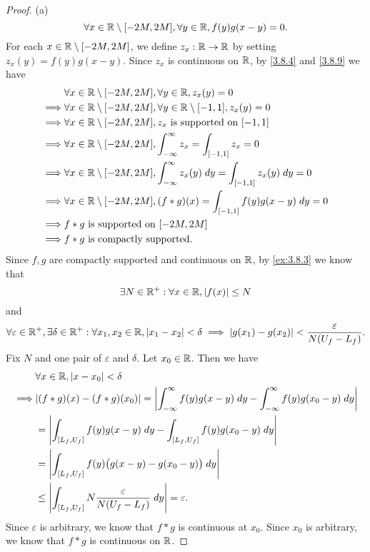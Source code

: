 \begin{proof}{(a)}
  \[
    \forall x \in \mathbb{R} \setminus [-2M, 2M], \forall y \in \mathbb{R}, f(y) g(x - y) = 0.
  \]
  For each \(x \in \mathbb{R} \setminus [-2M, 2M]\), we define \(z_x : \mathbb{R} \to \mathbb{R}\) by setting \(z_x(y) = f(y) g(x - y)\).
  Since \(z_x\) is continuous on \(\mathbb{R}\), by \cref{3.8.4} and \cref{3.8.9} we have
  \begin{align*}
             & \forall x \in \mathbb{R} \setminus [-2M, 2M], \forall y \in \mathbb{R}, z_x(y) = 0                                         \\
    \implies & \forall x \in \mathbb{R} \setminus [-2M, 2M], \forall y \in \mathbb{R} \setminus [-1, 1], z_x(y) = 0                       \\
    \implies & \forall x \in \mathbb{R} \setminus [-2M, 2M], z_x \text{ is supported on } [-1, 1]                                 \\
    \implies & \forall x \in \mathbb{R} \setminus [-2M, 2M], \int_{-\infty}^\infty z_x = \int_{[-1, 1]} z_x = 0                   \\
    \implies & \forall x \in \mathbb{R} \setminus [-2M, 2M], \int_{-\infty}^\infty z_x(y) \; dy = \int_{[-1, 1]} z_x(y) \; dy = 0 \\
    \implies & \forall x \in \mathbb{R} \setminus [-2M, 2M], (f * g)(x) = \int_{[-1, 1]} f(y) g(x - y) \; dy = 0                  \\
    \implies & f * g \text{ is supported on } [-2M, 2M]                                                                   \\
    \implies & f * g \text{ is compactly supported}.
  \end{align*}
  Since \(f, g\) are compactly supported and continuous on \(\mathbb{R}\), by \cref{ex:3.8.3} we know that
  \[
    \exists N \in \mathbb{R}^+ : \forall x \in \mathbb{R}, \left\lvert f(x)\right\rvert \leq N
  \]
  and
  \[
    \forall \varepsilon \in \mathbb{R}^+, \exists \delta \in \mathbb{R}^+ : \forall x_1, x_2 \in \mathbb{R}, \left\lvert x_1 - x_2\right\rvert < \delta \implies \left\lvert g(x_1) - g(x_2)\right\rvert < \dfrac{\varepsilon}{N (U_f - L_f)}.
  \]
  Fix \(N\) and one pair of \(\varepsilon\) and \(\delta\).
  Let \(x_0 \in \mathbb{R}\).
  Then we have
  \begin{align*}
             & \forall x \in \R, \abs{x - x_0} < \delta                                                                                        \\
    \implies & \abs{(f * g)(x) - (f * g)(x_0)} = \abs{\int_{-\infty}^\infty f(y) g(x - y) \; dy - \int_{-\infty}^\infty f(y) g(x_0 - y) \; dy} \\
             & = \abs{\int_{[L_f, U_f]} f(y) g(x - y) \; dy - \int_{[L_f, U_f]} f(y) g(x_0 - y) \; dy}                                         \\
             & = \abs{\int_{[L_f, U_f]} f(y) \big(g(x - y) - g(x_0 - y)\big) \; dy}                                                            \\
             & \leq \abs{\int_{[L_f, U_f]} N \dfrac{\varepsilon}{N (U_f - L_f)} \; dy} = \varepsilon.
  \end{align*}
  Since \(\varepsilon\) is arbitrary, we know that \(f * g\) is continuous at \(x_0\).
  Since \(x_0\) is arbitrary, we know that \(f * g\) is continuous on \(\mathbb{R}\).
\end{proof}

